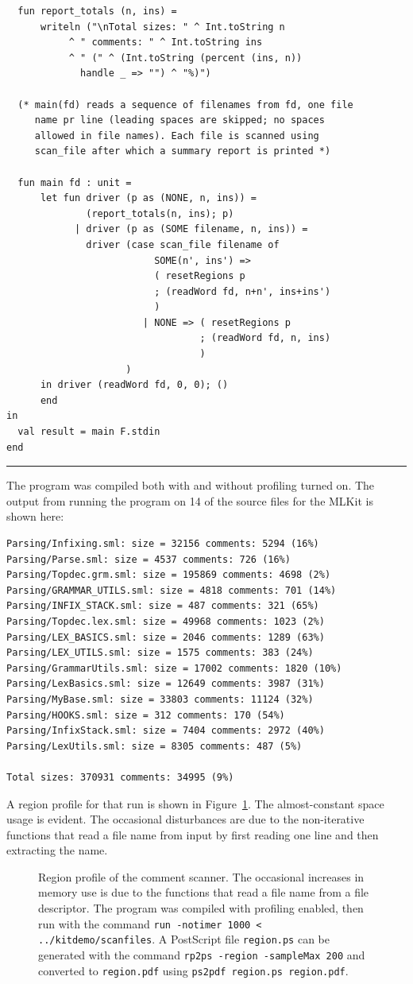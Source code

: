 \documentclass[12pt]{book}
\begin{document}
\begin{verbatim}
  fun report_totals (n, ins) =
      writeln ("\nTotal sizes: " ^ Int.toString n
	       ^ " comments: " ^ Int.toString ins
	       ^ " (" ^ (Int.toString (percent (ins, n))
			 handle _ => "") ^ "%)")

  (* main(fd) reads a sequence of filenames from fd, one file
     name pr line (leading spaces are skipped; no spaces
     allowed in file names). Each file is scanned using
     scan_file after which a summary report is printed *)

  fun main fd : unit =
      let fun driver (p as (NONE, n, ins)) =
              (report_totals(n, ins); p)
            | driver (p as (SOME filename, n, ins)) =
              driver (case scan_file filename of
                          SOME(n', ins') =>
                          ( resetRegions p
                          ; (readWord fd, n+n', ins+ins')
                          )
                        | NONE => ( resetRegions p
                                  ; (readWord fd, n, ins)
                                  )
                     )
      in driver (readWord fd, 0, 0); ()
      end
in
  val result = main F.stdin
end
\end{verbatim}
\hrule
\bigskip

The program was compiled both with and without profiling turned on.
The output from running the program on 14 of the source files for the
MLKit is shown here:
\begin{verbatim}
Parsing/Infixing.sml: size = 32156 comments: 5294 (16%)
Parsing/Parse.sml: size = 4537 comments: 726 (16%)
Parsing/Topdec.grm.sml: size = 195869 comments: 4698 (2%)
Parsing/GRAMMAR_UTILS.sml: size = 4818 comments: 701 (14%)
Parsing/INFIX_STACK.sml: size = 487 comments: 321 (65%)
Parsing/Topdec.lex.sml: size = 49968 comments: 1023 (2%)
Parsing/LEX_BASICS.sml: size = 2046 comments: 1289 (63%)
Parsing/LEX_UTILS.sml: size = 1575 comments: 383 (24%)
Parsing/GrammarUtils.sml: size = 17002 comments: 1820 (10%)
Parsing/LexBasics.sml: size = 12649 comments: 3987 (31%)
Parsing/MyBase.sml: size = 33803 comments: 11124 (32%)
Parsing/HOOKS.sml: size = 312 comments: 170 (54%)
Parsing/InfixStack.sml: size = 7404 comments: 2972 (40%)
Parsing/LexUtils.sml: size = 8305 comments: 487 (5%)

Total sizes: 370931 comments: 34995 (9%)
\end{verbatim}
A region profile for that run is shown in Figure~\ref{scan.fig}.  The
almost-constant space usage is evident. The occasional disturbances
are due to the non-iterative functions that read a file name from
input by first reading one line and then extracting the name.
\begin{figure}
\caption{Region profile of the comment scanner. The occasional
  increases in memory use is due to the functions that read a file
  name from a file descriptor.  The program was compiled with
  profiling enabled, then run with the command \texttt{run -notimer
    1000 < ../kitdemo/scanfiles}. A PostScript file \texttt{region.ps}
  can be generated with the command \texttt{rp2ps -region -sampleMax
    200} and converted to \texttt{region.pdf} using \texttt{ps2pdf
    region.ps region.pdf}. }
\label{scan.fig}
\end{figure}
\end{document}
